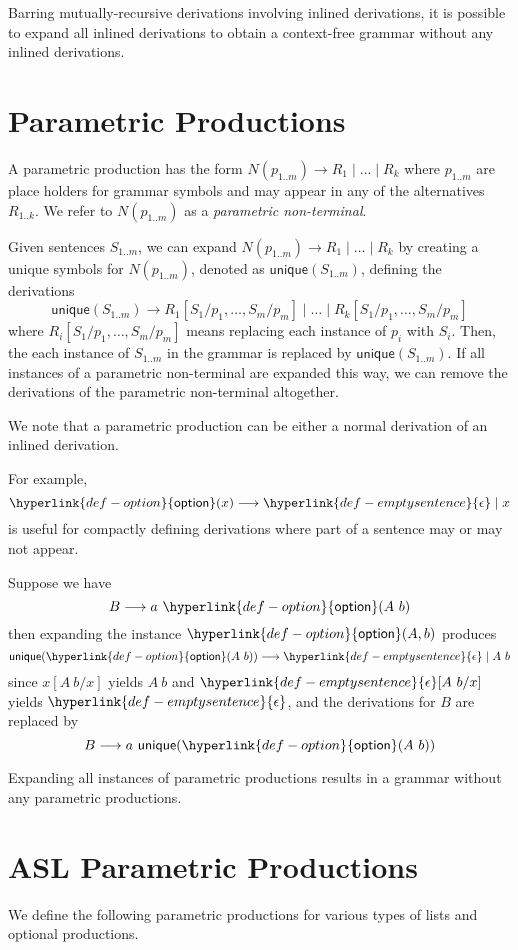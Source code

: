 \documentclass{book}
\newcommand\emptysentence[0]{\hyperlink{def-emptysentence}{\epsilon}}
\newcommand\derives[0]{\longrightarrow}
\newcommand\parsesep[0]{\ } %
\newcommand\option[1]{\hyperlink{def-option}{\textsf{option}}(#1)}
\begin{document}
Barring mutually-recursive derivations involving inlined derivations, it is possible to expand
all inlined derivations to obtain a context-free grammar without any inlined derivations.

\section{Parametric Productions \label{sec:ParametricProductions}}
A parametric production has the form
$N(p_{1..m}) \derives R_1 \;|\; \ldots \;|\; R_k$
where $p_{1..m}$ are place holders for grammar symbols and may appear in any of the alternatives $R_{1..k}$.
We refer to $N(p_{1..m})$ as a \emph{parametric non-terminal}.

\newcommand\uniquesymb[1]{\textsf{unique}(#1)}
Given sentences $S_{1..m}$, we can expand $N(p_{1..m}) \derives R_1 \;|\; \ldots \;|\; R_k$
by creating a unique symbols for $N(p_{1..m})$, denoted as $\uniquesymb{S_{1..m}}$, defining the
derivations
\[
  \uniquesymb{S_{1..m}} \derives R_1[S_1/p_1,\ldots,S_m/p_m] \;|\; \ldots \;|\; R_k[S_1/p_1,\ldots,S_m/p_m]
\]
where $R_i[S_1/p_1,\ldots,S_m/p_m]$ means replacing each instance of $p_i$ with $S_i$.
Then, the each instance of $S_{1..m}$ in the grammar is replaced by $\uniquesymb{S_{1..m}}$.
If all instances of a parametric non-terminal are expanded this way, we can remove the derivations of the parametric
non-terminal altogether.

We note that a parametric production can be either a normal derivation of an inlined derivation.

For example,
\[
  \option{x} \derives \emptysentence \;|\; x
\]
is useful for compactly defining derivations where part of a sentence may or may not appear.

Suppose we have
\[
B \derives a \parsesep \option{A \parsesep b}
\]
then expanding the instance $\option{A, b}$ produces
\[
\uniquesymb{\option{A \parsesep b}} \derives \emptysentence \;|\; A \parsesep b
\]
since $x[A \parsesep b/x]$ yields $A \parsesep b$ and $\emptysentence[A \parsesep b/x]$ yields $\emptysentence$,
and the derivations for $B$ are replaced by
\[
B \derives a \parsesep \uniquesymb{\option{A \parsesep b}}
\]

Expanding all instances of parametric productions results in a grammar without any parametric productions.

\section{ASL Parametric Productions \label{sec:ASLParametricProductions}}
We define the following parametric productions for various types of lists and optional productions.
\end{document}
